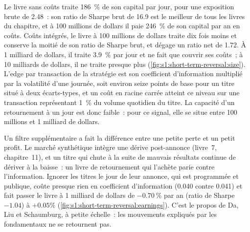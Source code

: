 Le livre sans coûts traite 186~\% de son capital par jour, pour une exposition brute de 2.48~: son ratio de Sharpe brut de 16.9 est le meilleur de tous les livres du chapitre, et
à 100 millions de dollars il paie 246~\% de son capital par an en coûts. Coûts intégrés, le livre à 100 millions de dollars traite dix fois moins et conserve la moitié de son
ratio de Sharpe brut, et dégage un ratio net de 1.72. À 1 milliard de dollars, il traite 3.9~\% par jour et ne fait que couvrir ses coûts~; à 10 milliards de dollars, il ne traite presque plus
(\cref{fig:s1:short-term-reversal:size}). L'edge par transaction de la stratégie est son coefficient d'information multiplié par la volatilité d'une journée, soit environ seize points de base
pour un titre situé à deux écarts-types, et un coût en racine carrée atteint ce niveau sur une transaction représentant 1~\% du volume quotidien du titre. La capacité d'un retournement à un jour
est donc faible~: pour ce signal, elle se situe entre 100 millions et 1 milliard de dollars.

\begin{omfigure}

\label{fig:s1:short-term-reversal:size}
\end{omfigure}

Un filtre supplémentaire a fait la différence entre une petite perte et un petit profit. Le marché synthétique intègre une dérive post-annonce (livre~7, chapitre~11), et un
titre qui chute à la suite de mauvais résultats continue de dériver à la baisse~: un livre de retournement qui l'achète parie contre l'information. Ignorer les titres le jour de leur annonce, qui
est programmée et publique, coûte presque rien en coefficient d'information (0.040 contre 0.041) et fait passer le livre à 1 milliard de dollars de $-0.70~\%$ par an
(ratio de Sharpe $-1.04$) à $+0.05\%$ (\cref{fig:s1:short-term-reversal:earnings}). C'est le propos de Da, Liu et Schaumburg, à petite échelle~: les mouvements expliqués par
les fondamentaux ne se retournent pas.

